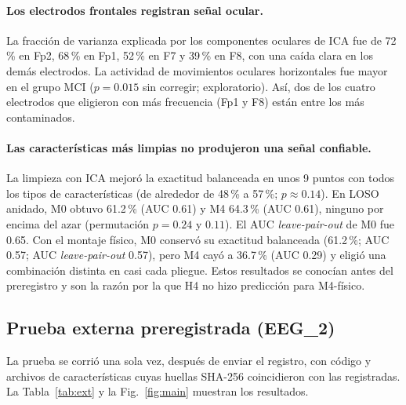 \paragraph{Los electrodos frontales registran señal ocular.} La fracción de varianza explicada por los componentes oculares de ICA fue de 72\,\% en Fp2, 68\,\% en Fp1, 52\,\% en F7 y 39\,\% en F8, con una caída clara en los demás electrodos. La actividad de movimientos oculares horizontales fue mayor en el grupo MCI ($p=0.015$ sin corregir; exploratorio). Así, dos de los cuatro electrodos que \citet{aljalal2024} eligieron con más frecuencia (Fp1 y F8) están entre los más contaminados.

\paragraph{Las características más limpias no produjeron una señal confiable.} La limpieza con ICA mejoró la exactitud balanceada en unos 9 puntos con todos los tipos de características (de alrededor de 48\,\% a 57\,\%; $p\approx0.14$). En LOSO anidado, M0 obtuvo 61.2\,\% (AUC 0.61) y M4 64.3\,\% (AUC 0.61), ninguno por encima del azar (permutación $p=0.24$ y $0.11$). El AUC \emph{leave-pair-out} de M0 fue 0.65. Con el montaje físico, M0 conservó su exactitud balanceada (61.2\,\%; AUC 0.57; AUC \emph{leave-pair-out} 0.57), pero M4 cayó a 36.7\,\% (AUC 0.29) y eligió una combinación distinta en casi cada pliegue. Estos resultados se conocían antes del preregistro y son la razón por la que H4 no hizo predicción para M4-físico.

\subsection{Prueba externa preregistrada (EEG\_2)}

La prueba se corrió una sola vez, después de enviar el registro, con código y archivos de características cuyas huellas SHA-256 coincidieron con las registradas. La Tabla~\ref{tab:ext} y la Fig.~\ref{fig:main} muestran los resultados.

